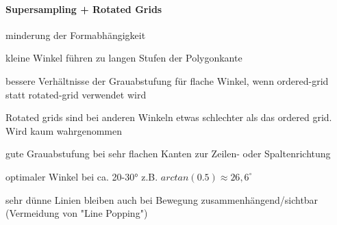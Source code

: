 \documentclass[landscape]{article}
\begin{document}
\begin{multicols}{3}
  \paragraph{Supersampling + Rotated Grids}
  \begin{itemize*}
    \item minderung der Formabhängigkeit
    \item kleine Winkel führen zu langen Stufen der Polygonkante
    \item bessere Verhältnisse der Grauabstufung für flache Winkel, wenn ordered-grid statt rotated-grid verwendet wird
    \item Rotated grids sind bei anderen Winkeln etwas schlechter als das ordered grid. Wird kaum wahrgenommen
    \item gute Grauabstufung bei sehr flachen Kanten zur Zeilen- oder Spaltenrichtung
    \item optimaler Winkel bei ca. 20-30° z.B. $arctan(0.5) \approx 26,6^{\circ}$
    \item sehr dünne Linien bleiben auch bei Bewegung zusammenhängend/sichtbar (Vermeidung von "Line Popping")
  \end{itemize*}
  

\end{multicols}
\end{document}
